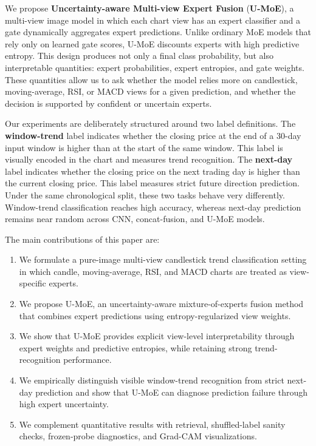 \documentclass[
]{article}
\providecommand{\tightlist}{%
  \setlength{\itemsep}{0pt}\setlength{\parskip}{0pt}}
\begin{document}
We propose \textbf{Uncertainty-aware Multi-view Expert Fusion}
(\textbf{U-MoE}), a multi-view image model in which each chart view has
an expert classifier and a gate dynamically aggregates expert
predictions. Unlike ordinary MoE models that rely only on learned gate
scores, U-MoE discounts experts with high predictive entropy. This
design produces not only a final class probability, but also
interpretable quantities: expert probabilities, expert entropies, and
gate weights. These quantities allow us to ask whether the model relies
more on candlestick, moving-average, RSI, or MACD views for a given
prediction, and whether the decision is supported by confident or
uncertain experts.

Our experiments are deliberately structured around two label
definitions. The \textbf{window-trend} label indicates whether the
closing price at the end of a 30-day input window is higher than at the
start of the same window. This label is visually encoded in the chart
and measures trend recognition. The \textbf{next-day} label indicates
whether the closing price on the next trading day is higher than the
current closing price. This label measures strict future direction
prediction. Under the same chronological split, these two tasks behave
very differently. Window-trend classification reaches high accuracy,
whereas next-day prediction remains near random across CNN,
concat-fusion, and U-MoE models.

The main contributions of this paper are:

\begin{enumerate}
\def\labelenumi{\arabic{enumi}.}
\tightlist
\item
  We formulate a pure-image multi-view candlestick trend classification
  setting in which candle, moving-average, RSI, and MACD charts are
  treated as view-specific experts.
\item
  We propose U-MoE, an uncertainty-aware mixture-of-experts fusion
  method that combines expert predictions using entropy-regularized view
  weights.
\item
  We show that U-MoE provides explicit view-level interpretability
  through expert weights and predictive entropies, while retaining
  strong trend-recognition performance.
\item
  We empirically distinguish visible window-trend recognition from
  strict next-day prediction and show that U-MoE can diagnose prediction
  failure through high expert uncertainty.
\item
  We complement quantitative results with retrieval, shuffled-label
  sanity checks, frozen-probe diagnostics, and Grad-CAM visualizations.
\end{enumerate}
\end{document}
